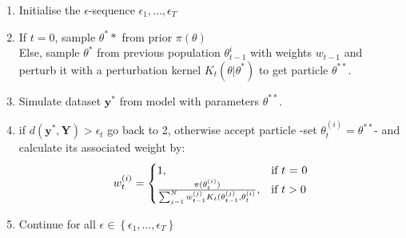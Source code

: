 \begin{enumerate}[noitemsep]
\item{Initialise the $\epsilon$-sequence $\epsilon_{1}, \dots, \epsilon_{T}$}
\item{If $t=0$, sample $\theta^**$ from prior $\pi(\theta)$\\
Else, sample $\theta^*$ from previous population $\theta_{t-1}^{i}$ with weights $w_{t-1}$ and perturb it with a perturbation kernel $K_{t}(\theta|\theta^*) $ to get particle $\theta^{**}$.}
\item{Simulate dataset $\mathbf{y}^*$ from model with parameters $\theta^{**}$.}
\item{if $d(\mathbf{y}^*, \mathbf{Y}) > \epsilon_{t}$ go back to 2, otherwise accept particle -set $\theta_{t}^{(i)} = \theta^{**}$- and calculate its associated weight by:
\begin{equation}
w_{t}^{(i)} = \begin{cases} 1, & \mbox{if } t\mbox{ = 0} \\ \frac{\pi(\theta_{t}^{(i)})}{\sum_{j-1}^N w_{t-1}^{(j)}K_{t}(\theta_{t-1}^{(j)}, \theta_{t}^{(i)}} , & \mbox{if } \mbox{$ t > 0$} \end{cases}
\end{equation} }
\item{Continue for all $\epsilon \in \left\{{\epsilon_{1}, \dots, \epsilon_{T}}\right\}$}
\end{enumerate}

